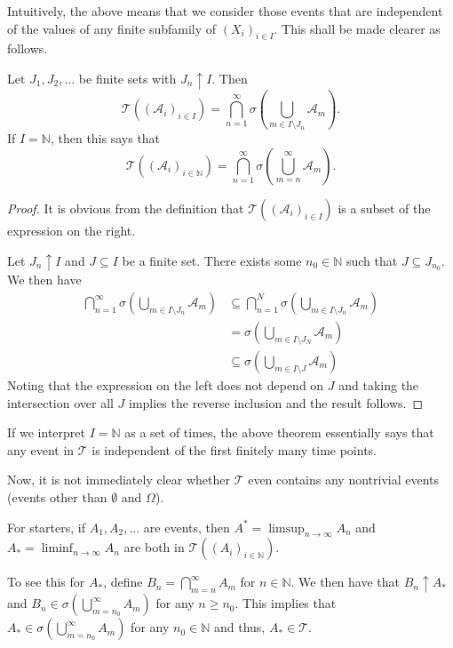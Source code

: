 Intuitively, the above means that we consider those events that are independent of the values of any finite subfamily of $(X_i)_{i\in I}$. This shall be made clearer as follows.

\begin{theorem}
    Let $J_1,J_2,\ldots$ be finite sets with $J_n\uparrow I$. Then
    $$\mathcal{T}((\mathcal{A}_i)_{i\in I})=\bigcap_{n=1}^\infty \sigma\left(\bigcup_{m\in I\setminus J_n} \mathcal{A}_m\right).$$
    If $I=\mathbb{N}$, then this says that
    $$\mathcal{T}((\mathcal{A}_i)_{i\in\mathbb{N}}) = \bigcap_{n=1}^\infty \sigma\left(\bigcup_{m=n}^\infty \mathcal{A}_m\right).$$
\end{theorem}
\begin{proof}
    It is obvious from the definition that $\mathcal{T}((\mathcal{A}_i)_{i\in I})$ is a subset of the expression on the right.
    
    Let $J_n\uparrow I$ and $J\subseteq I$ be a finite set. There exists some $n_0\in\mathbb{N}$ such that $J\subseteq J_{n_0}$. We then have
    \begin{align*}
        \bigcap_{n=1}^\infty \sigma\left(\bigcup_{m\in I\setminus J_n} \mathcal{A}_m\right) &\subseteq \bigcap_{n=1}^N \sigma\left(\bigcup_{m\in I\setminus J_n} \mathcal{A}_m\right) \\
        &= \sigma\left(\bigcup_{m\in I\setminus J_N} \mathcal{A}_m\right) \\
        &\subseteq \sigma\left(\bigcup_{m\in I\setminus J} \mathcal{A}_m\right)
    \end{align*}
    Noting that the expression on the left does not depend on $J$ and taking the intersection over all $J$ implies the reverse inclusion and the result follows.
\end{proof}

If we interpret $I=\mathbb{N}$ as a set of times, the above theorem essentially says that any event in $\mathcal{T}$ is independent of the first finitely many time points.

\vspace{2mm}
Now, it is not immediately clear whether $\mathcal{T}$ even contains any nontrivial events (events other than $\emptyset$ and $\Omega$).

\vspace{2mm}
For starters, if $A_1,A_2,\ldots$ are events, then $A^*=\limsup_{n\to\infty} A_n$ and $A_*=\liminf_{n\to\infty} A_n$ are both in $\mathcal{T}((A_i)_{i\in \mathbb{N}})$.

\vspace{1mm}
To see this for $A_*$, define $B_n=\bigcap_{m=n}^\infty A_m$ for $n\in\mathbb{N}$. We then have that $B_n\uparrow A_*$ and $B_n\in\sigma(\bigcup_{m=n_0}^\infty A_m)$ for any $n\geq n_0$. This implies that $A_*\in\sigma(\bigcup_{m=n_0}^\infty A_m)$ for any $n_0\in\mathbb{N}$ and thus, $A_*\in\mathcal{T}$.

